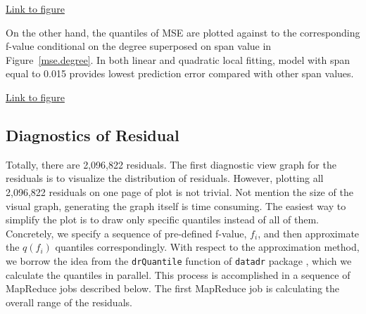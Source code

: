 \begin{framed}
\begin{center}
  \href{../plots/a1950/spafit/QuanMABSE.a1950.tmax.span.pdf}{Link to figure}
  \label{mse.span}
\end{center}
\end{framed}

On the other hand, the quantiles of MSE are plotted against to the corresponding
f-value conditional on the degree superposed on span value in 
Figure~\href{../plots/a1950/spafit/QuanMABSE.a1950.tmax.degree.pdf}
{\ref*{mse.degree}}. In both linear and quadratic local fitting, model with span
equal to 0.015 provides lowest prediction error compared with other span values.

\begin{framed}
\begin{center}
  \href{../plots/a1950/spafit/QuanMABSE.a1950.tmax.degree.pdf}{Link to figure}
  \label{mse.degree}
\end{center}
\end{framed}

\subsection{Diagnostics of Residual}

Totally, there are 2,096,822 residuals. The first diagnostic view graph for the
residuals is to visualize the distribution of residuals. 
However, plotting all 2,096,822 residuals on one page of plot is not trivial. Not
mention the size of the visual graph, generating the graph itself is time 
consuming. The easiest way to simplify the plot is to draw only specific quantiles
instead of all of them. Concretely, we specify a sequence of pre-defined f-value,
$f_i$, and then approximate the $q(f_i)$ quantiles correspondingly. With respect
to the approximation method, we borrow the idea from the \texttt{drQuantile} 
function of \texttt{datadr} package \cite{datadr}, which we calculate the quantiles
in parallel. This process is accomplished in a sequence of MapReduce jobs described 
below. The first MapReduce job is calculating the overall range of the residuals.

